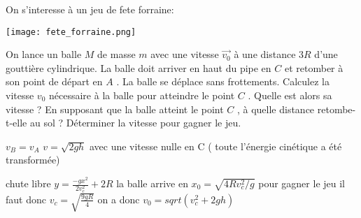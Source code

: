 \begin{Exercise}[title=]
  On s'interesse à un jeu de fete forraine:
  \begin{center}
    \texttt{[image: fete\_forraine.png]}
  \end{center}
  \Question On lance un balle $M$ de masse $m$ avec une vitesse $\vec{v_0}$ à
  une distance $3R$ d'une gouttière cylindrique. La balle doit arriver en haut
  du pipe en $C$ et retomber à son point de départ en $A$ . La balle se déplace sans
  frottements.
  \Question Calculez la vitesse $v_0$ nécessaire à la balle pour atteindre le
  point $C$ . Quelle est alors sa vitesse ?
  \Question En supposant que la balle atteint le point $C$ , à quelle distance
  retombe-t-elle au sol ?
  \Question  Déterminer la vitesse pour gagner le jeu.
\end{Exercise}
\begin{Answer}
  \Question $v_B=v_A$
  \Question $v=\sqrt{2gh}$ avec une vitesse nulle en C ( toute l'énergie
  cinétique a été transformée)

  \Question chute libre $y=\frac{-gx^2}{2v_c^2}+2R$ la balle arrive en
  $x_0=\sqrt{4Rv_c^2/g}$
  \Question pour gagner le jeu il faut donc $v_c=\sqrt{\frac{9gR}{4}}$ on a donc
  $v_0=sqrt(v_c^2+2gh)$
\end{Answer}
